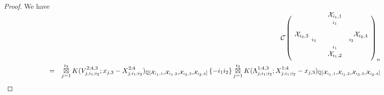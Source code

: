 \documentclass[10pt]{amsart}
\theoremstyle{break}
\begin{document}
\begin{proof}
 We have
\begin{eqnarray*}
&&{{\mathcal{C}}}\acute{}\left( 
\unitlength 0.1in
\begin{picture}( 16.0000,  5.0000)( -2.0000,-7.0000)
\special{pn 8}\special{pa 600 900}\special{pa 600 800}\special{fp}\special{sh 1}\special{pa 600 800}\special{pa 580 868}\special{pa 600 854}\special{pa 620 868}\special{pa 600 800}\special{fp}\special{sh 1}\special{pa 600 400}\special{pa 530 402}\special{pa 549 417}\special{pa 543 440}\special{pa 600 400}\special{fp}\special{sh 1}\special{pa 600 800}\special{pa 657 760}\special{pa 651 783}\special{pa 670 798}\special{pa 600 800}\special{fp}\special{pn 8}\special{pa 600 400}\special{pa 600 300}\special{fp}\special{sh 1}\special{pa 600 300}\special{pa 580 368}\special{pa 600 354}\special{pa 620 368}\special{pa 600 300}\special{fp}\special{pn 8}\special{pa 600 800}\special{pa 558 786}\special{pa 516 772}\special{pa 474 758}\special{pa 434 744}\special{pa 394 728}\special{pa 358 714}\special{pa 326 700}\special{pa 294 686}\special{pa 268 672}\special{pa 244 658}\special{pa 226 644}\special{pa 212 628}\special{pa 204 614}\special{pa 200 600}\special{pa 204 586}\special{pa 212 572}\special{pa 226 558}\special{pa 246 542}\special{pa 268 528}\special{pa 296 514}\special{pa 326 500}\special{pa 360 486}\special{pa 396 472}\special{pa 436 458}\special{pa 476 442}\special{pa 518 428}\special{pa 560 414}\special{pa 600 400}\special{sp}\special{pn 8}\special{pa 600 400}\special{pa 644 414}\special{pa 686 430}\special{pa 728 444}\special{pa 768 458}\special{pa 806 472}\special{pa 842 486}\special{pa 876 500}\special{pa 906 514}\special{pa 934 530}\special{pa 956 544}\special{pa 976 558}\special{pa 990 572}\special{pa 998 586}\special{pa 1000 600}\special{pa 998 616}\special{pa 988 630}\special{pa 974 644}\special{pa 956 658}\special{pa 932 672}\special{pa 906 686}\special{pa 874 702}\special{pa 840 716}\special{pa 804 730}\special{pa 766 744}\special{pa 726 758}\special{pa 684 772}\special{pa 642 786}\special{pa 600 800}\special{sp}\put(6.75000,-3.50000){\makebox(0,0){${}_{i_1}$}}\put(6.75000,-8.50000){\makebox(0,0){${}_{i_1}$}}\put(6.75000,-2.00000){\makebox(0,0){$\mathcal{X}_{i_1,1}$}}\put(6.75000,-10.00000){\makebox(0,0){$\mathcal{X}_{i_1,2}$}}\put(2.5000,-7.0000){\makebox(0,0){${}_{i_3}$}}\put(10.1000,-7.0000){\makebox(0,0){${}_{i_2}$}}\put(0.0000,-6.0000){\makebox(0,0){$\mathcal{X}_{i_3,3}$}}\put(12.0000,-6.0000){\makebox(0,0){$\mathcal{X}_{i_2,4}$}}\special{pn 8}\special{pa 250 600}\special{pa 150 600}\special{fp}\special{pn 8}\special{pa 1050 600}\special{pa 950 600}\special{fp}\end{picture}
\right)_n \\[-0.1em]
&=&\mathop{\boxtimes}_{j=1}^{i_3} K(V_{j,i_1;i_2}^{2;4,3};x_{j,3}-X_{j,i_1;i_2}^{2;4})_{{{\mathbb{Q}}} [\mathcal{X}_{i_{1},1},\mathcal{X}_{i_{1},2},\mathcal{X}_{i_{3},3},\mathcal{X}_{i_{2},4}]}\left\{ -i_1 i_2 \right\}
\mathop{\boxtimes}_{j=1}^{i_3} K(\Lambda_{j,i_1;i_2}^{1;4,3};X_{j,i_1;i_2}^{1;4}-x_{j,3})_{{{\mathbb{Q}}}[\mathcal{X}_{i_{1},1},\mathcal{X}_{i_{1},2},\mathcal{X}_{i_{3},3},\mathcal{X}_{i_{2},4}]}
\end{eqnarray*}


\end{proof}
\end{document}
